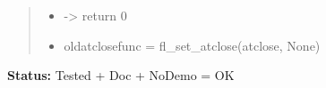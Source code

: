 \begin{boxedminipage}{\funcwidth}
\begin{quote}
\begin{itemize}
  \item {\textbar}-{\textgreater}{\textbar} return 0



  \item oldatclosefunc = fl\_set\_atclose(atclose, None)



\end{itemize}

\end{quote}

\textbf{Status:} Tested + Doc + NoDemo = OK



    \end{boxedminipage}

    \label{xformslib:flbasic:fl_set_form_atactivate}

    \vspace{0.5ex}


